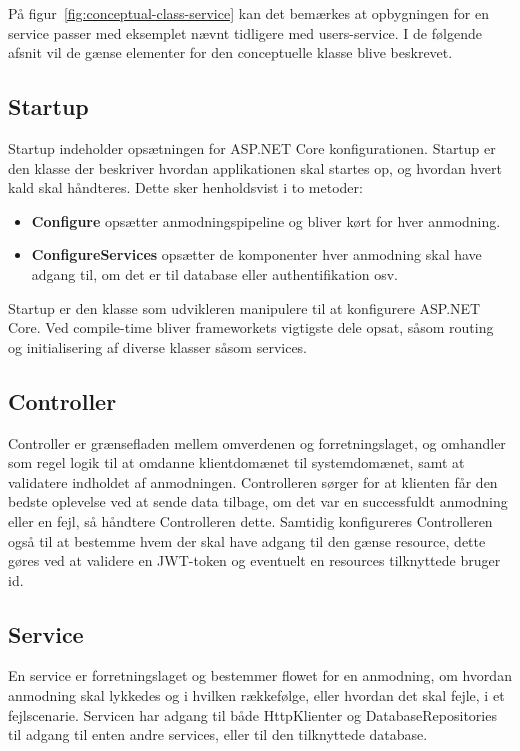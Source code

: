 På figur~\ref{fig:conceptual-class-service} kan det bemærkes at opbygningen for en service passer med eksemplet nævnt tidligere med users-service. I de følgende afsnit vil de gænse elementer for den conceptuelle klasse blive beskrevet.

\subsection{Startup}

Startup indeholder opsætningen for ASP.NET Core konfigurationen. Startup er den klasse der beskriver hvordan applikationen skal startes op, og hvordan hvert kald skal håndteres. Dette sker henholdsvist i to metoder:

\begin{itemize}
  \item \textbf{Configure} opsætter anmodningspipeline og bliver kørt for hver anmodning.
  \item \textbf{ConfigureServices} opsætter de komponenter hver anmodning skal have adgang til, om det er til database eller authentifikation osv.
\end{itemize}

Startup er den klasse som udvikleren manipulere til at konfigurere ASP.NET Core. Ved compile-time bliver frameworkets vigtigste dele opsat, såsom routing og initialisering af diverse klasser såsom services.

\subsection{Controller}

Controller er grænsefladen mellem omverdenen og forretningslaget, og omhandler som regel logik til at omdanne klientdomænet til systemdomænet, samt at validatere indholdet af anmodningen. Controlleren sørger for at klienten får den bedste oplevelse ved at sende data tilbage, om det var en successfuldt anmodning eller en fejl, så håndtere Controlleren dette. Samtidig konfigureres Controlleren også til at bestemme hvem der skal have adgang til den gænse resource, dette gøres ved at validere en JWT-token og eventuelt en resources tilknyttede bruger id.

\subsection{Service}

En service er forretningslaget og bestemmer flowet for en anmodning, om hvordan anmodning skal lykkedes og i hvilken rækkefølge, eller hvordan det skal fejle, i et fejlscenarie. Servicen har adgang til både HttpKlienter og DatabaseRepositories til adgang til enten andre services, eller til den tilknyttede database.

